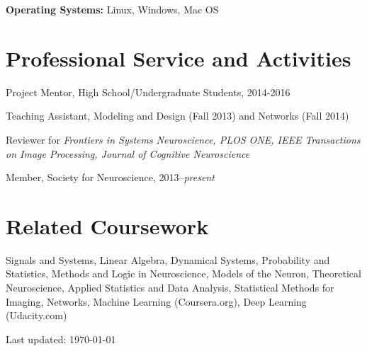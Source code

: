 \documentclass[10pt,letterpaper]{article}
\def\footerlink{} %
\renewenvironment{itemize}{
  \begin{list}{}{
    \setlength{\leftmargin}{1.5em}
    \setlength{\itemsep}{0.25em}
    \setlength{\parskip}{0pt}
    \setlength{\parsep}{0.25em}
  }
}{
  \end{list}
}
\begin{document}
\hspace{1.5em}\textbf{Operating Systems:} Linux, Windows, Mac OS

\vspace{-0.1in}

\section*{Professional Service and Activities}
\vspace{-0.05in}
\begin{itemize}
\setlength\itemsep{1pt}
\item Project Mentor, High School/Undergraduate Students, 2014-2016
\item Teaching Assistant, Modeling and Design (Fall 2013) and Networks (Fall 2014)
\item Reviewer for \textit{Frontiers in Systems Neuroscience, PLOS ONE, IEEE Transactions on Image Processing, Journal of Cognitive Neuroscience}

\item Member, Society for Neuroscience, 2013--\textit{present}
\end{itemize}

\vspace{-0.25in}

\section*{Related Coursework}
\vspace{-0.05in}
\begin{itemize}
\item Signals and Systems,
Linear Algebra,
Dynamical Systems,
Probability and Statistics,
Methods and Logic in Neuroscience,
Models of the Neuron,
Theoretical Neuroscience,
Applied Statistics and Data Analysis,
Statistical Methods for Imaging,
Networks, Machine Learning (Coursera.org), Deep Learning (Udacity.com)
\end{itemize}

\bigskip

\begin{center}
  \begin{footnotesize}
    Last updated: \today \\
    \href{\footerlink}{\texttt{\footerlink}}
  \end{footnotesize}
\end{center}
\end{document}

